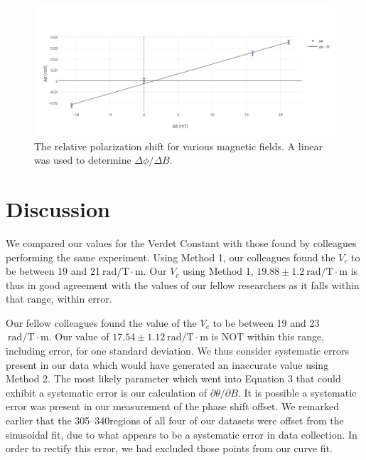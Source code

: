 \documentclass[prb,preprint]{revtex4-1}
\begin{document}
{{\begin{figure}
\includegraphics[width =6.3in]{verdet1.pdf}
\caption{\label{method2pic} The relative polarization shift for various magnetic fields. A linear was used to determine $\Delta \phi/\Delta B$.}
\end{figure}

\section{Discussion}

{We compared our values for the Verdet Constant with those found by colleagues performing the same experiment.  Using Method 1, our colleagues found the $V_{c}$ to be between 19 and 21$\mathrm{~rad/T} \cdot \textrm{m}$.  Our $V_{c}$ using Method 1, $19.88 \pm 1.2 \mathrm{~rad/T} \cdot \textrm{m}$ is thus in good agreement with the values of our fellow researchers as it falls within that range, within error.

{Our fellow colleagues found the value of the $V_{c}$ to be between 19 and 23 $\mathrm{~rad/T} \cdot \textrm{m}$.  Our value of $17.54 \pm 1.12 \mathrm{~rad/T} \cdot \textrm{m}$ is NOT within this range, including error, for one standard deviation.  We thus consider systematic errors present in our data which would have generated an inaccurate value using Method 2.  The most likely parameter which went into Equation 3 that could exhibit a systematic error is our calculation of $\partial \theta/\partial B$.  It is possible a systematic error was present in our measurement of the phase shift offset.  We remarked earlier that the 305\degree--340\degree regions of all four of our datasets were offset from the sinusoidal fit, due to what appears to be a systematic error in data collection.  In order to rectify this error, we had excluded those points from our curve fit. 

}}}}
\end{document}
